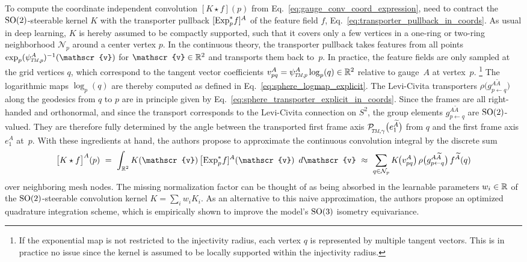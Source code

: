 To compute the coordinate independent convolution $[K \star f](p)$ from Eq.~\eqref{eq:gauge_conv_coord_expression}, \citet{kicanaoglu2019gaugeSphere} need to contract the $\operatorname{SO}(2)$-steerable kernel $K$ with the transporter pullback $[\operatorname{Exp}^*_p\mkern-2mu f]^A$ of the feature field $f$, Eq.~\eqref{eq:transporter_pullback_in_coords}.
As usual in deep learning, $K$ is hereby assumed to be compactly supported, such that it covers only a few vertices in a one-ring or two-ring neighborhood $\mathcal{N}_p$ around a center vertex $p$.
In the continuous theory, the transporter pullback takes features from all points $\exp_p (\psiTMp^A)^{-1}(\mathscr{v})$ for $\mathscr{v} \in \R^2$ and transports them back to~$p$.
In practice, the feature fields are only sampled at the grid vertices $q$, which correspond to the tangent vector coefficients $v^A_{pq} = \psiTMp^A \log_p(q) \in \R^2$ relative to gauge~$A$ at vertex~$p$.%
\footnote{
    If the exponential map is not restricted to the injectivity radius, each vertex $q$ is represented by multiple tangent vectors.
    This is in practice no issue since the kernel is assumed to be locally supported within the injectivity radius.
}
The logarithmic maps $\log_p(q)$ are thereby computed as defined in Eq.~\eqref{eq:sphere_logmap_explicit}.
The Levi-Civita transporters $\rho\big( g_{p\leftarrow q}^{A\widetilde{A}}\big)$ along the geodesics from $q$ to $p$ are in principle given by Eq.~\eqref{eq:sphere_transporter_explicit_in_coords}.
Since the frames are all right-handed and orthonormal, and since the transport corresponds to the Levi-Civita connection on $S^2$, the group elements $g_{p\leftarrow q}^{A\widetilde{A}}$ are $\operatorname{SO}(2)$-valued.
They are therefore fully determined by the angle between the transported first frame axis $\PTMgamma\big(e_1^{\widetilde{A}}\big)$ from $q$ and the first frame axis $e_1^A$ at~$p$.
With these ingredients at hand, the authors propose to approximate the continuous convolution integral by the discrete sum
\begin{align}
    \big[K\star f\big]^A(p)
    \ =\ \int_{\R^2} K(\mathscr{v})\, \big[\!\Expspf]^A(\mathscr{v}) \,\ d\mathscr{v}
    \ \approx\ \sum_{q\in\mathcal{N}_p} K\mkern-1.5mu\big(v^A_{pq}\big)\, \rho\big( g^{A\widetilde{A}}_{p\leftarrow q} \big)\, f^{\widetilde{A}}(q)
\end{align}
over neighboring mesh nodes.
The missing normalization factor can be thought of as being absorbed in the learnable parameters $w_i \in\mathbb{R}$ of the $\operatorname{SO}(2)$-steerable convolution kernel $K = \sum_i w_i K_i$.
As an alternative to this naive approximation, the authors propose an optimized quadrature integration scheme, which is empirically shown to improve the model's $\operatorname{SO}(3)$ isometry equivariance.


